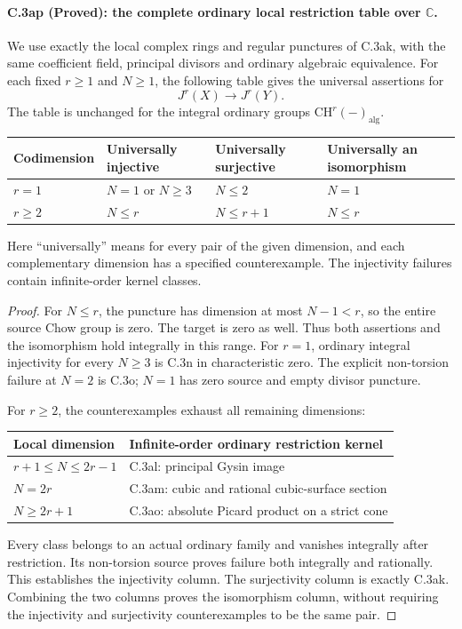 \paragraph{C.3ap (Proved): the complete ordinary local restriction table over $\mathbb C$.}
We use exactly the local complex rings and regular
punctures of C.3ak, with the same coefficient field,
principal divisors and ordinary algebraic equivalence.
For each fixed $r\ge1$ and $N\ge1$, the following
table gives the universal assertions for
\[
                   J^r(X)\longrightarrow J^r(Y).
\]
The table is unchanged for the integral ordinary
groups $\mathrm{CH}^r(-)_{\mathrm{alg}}$.
\begin{center}
\begin{tabular}{llll}
\toprule
Codimension & Universally injective & Universally surjective
                              & Universally an isomorphism \\
\midrule
$r=1$ & $N=1$ or $N\ge3$ & $N\le2$ & $N=1$ \\
$r\ge2$ & $N\le r$ & $N\le r+1$ & $N\le r$ \\
\bottomrule
\end{tabular}
\end{center}
Here ``universally'' means for every pair of the given
dimension, and each complementary dimension has a
specified counterexample. The injectivity failures
contain infinite-order kernel classes.

\begin{proof}
For $N\le r$, the puncture has dimension at most
$N-1<r$, so the entire source Chow group is zero.
The target is zero as well. Thus both assertions and
the isomorphism hold integrally in this range.
For $r=1$, ordinary integral injectivity for every
$N\ge3$ is C.3n in characteristic zero. The explicit
non-torsion failure at $N=2$ is C.3o; $N=1$ has
zero source and empty divisor puncture.

For $r\ge2$, the counterexamples exhaust all
remaining dimensions:
\begin{center}
\begin{tabular}{ll}
\toprule
Local dimension & Infinite-order ordinary restriction kernel \\
\midrule
$r+1\le N\le2r-1$ & C.3al: principal Gysin image \\
$N=2r$ & C.3am: cubic and rational cubic-surface section \\
$N\ge2r+1$ & C.3ao: absolute Picard product on a strict cone \\
\bottomrule
\end{tabular}
\end{center}
Every class belongs to an actual ordinary family and
vanishes integrally after restriction. Its non-torsion
source proves failure both integrally and rationally.
This establishes the injectivity column. The
surjectivity column is exactly C.3ak. Combining the
two columns proves the isomorphism column, without
requiring the injectivity and surjectivity
counterexamples to be the same pair.
\end{proof}

